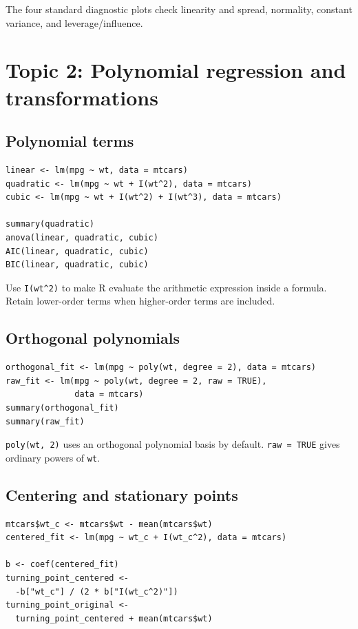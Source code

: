 \documentclass[11pt]{article}
\begin{document}
The four standard diagnostic plots check linearity and spread, normality,
constant variance, and leverage/influence.

\section{Topic 2: Polynomial regression and transformations}

\subsection{Polynomial terms}
\begin{lstlisting}
linear <- lm(mpg ~ wt, data = mtcars)
quadratic <- lm(mpg ~ wt + I(wt^2), data = mtcars)
cubic <- lm(mpg ~ wt + I(wt^2) + I(wt^3), data = mtcars)

summary(quadratic)
anova(linear, quadratic, cubic)
AIC(linear, quadratic, cubic)
BIC(linear, quadratic, cubic)
\end{lstlisting}

Use \texttt{I(wt\textasciicircum2)} to make R evaluate the arithmetic
expression inside a formula. Retain lower-order terms when higher-order terms
are included.

\subsection{Orthogonal polynomials}
\begin{lstlisting}
orthogonal_fit <- lm(mpg ~ poly(wt, degree = 2), data = mtcars)
raw_fit <- lm(mpg ~ poly(wt, degree = 2, raw = TRUE),
              data = mtcars)
summary(orthogonal_fit)
summary(raw_fit)
\end{lstlisting}

\texttt{poly(wt, 2)} uses an orthogonal polynomial basis by default.
\texttt{raw = TRUE} gives ordinary powers of \texttt{wt}.

\subsection{Centering and stationary points}
\begin{lstlisting}
mtcars$wt_c <- mtcars$wt - mean(mtcars$wt)
centered_fit <- lm(mpg ~ wt_c + I(wt_c^2), data = mtcars)

b <- coef(centered_fit)
turning_point_centered <-
  -b["wt_c"] / (2 * b["I(wt_c^2)"])
turning_point_original <-
  turning_point_centered + mean(mtcars$wt)
\end{lstlisting}
\end{document}
